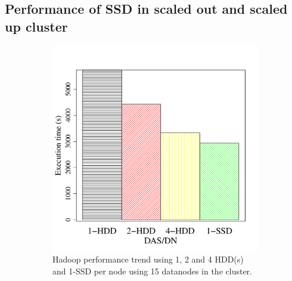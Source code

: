 \documentclass[10pt, conference, compsocconf]{IEEEtran}
\begin{document}
\subsection {Performance of SSD in scaled out and scaled up cluster} \label{ScaledupClusterAndSSD}
\vspace{-1.9em}
\begin{figure}[h]
  \centering
  \begin{subfigure}[b]{0.23\textwidth}
          \includegraphics[width=\textwidth]{Figure/PerormanceData/Plots/SSDHDDSameNode.pdf}
          \caption{Hadoop performance trend using 1, 2 and 4 HDD(s) and 1-SSD per node using 15 datanodes in the cluster.}
          \label{fig:SsdN4Hdd}
  \end{subfigure}
  \begin{subfigure}[b]{0.23\textwidth}

\end{subfigure}
\end{figure}
\end{document}
